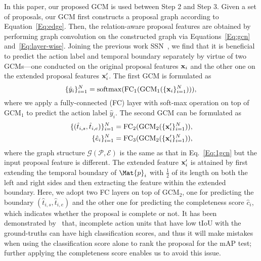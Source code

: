 \documentclass[10pt,journal,compsoc]{IEEEtran}
\begin{document}
	In this paper, our proposed GCM is used between Step 2 and Step 3. 
	Given a set of proposals, our GCM first constructs a proposal graph according to Equation~\eqref{Eq:edge}. Then, the relation-aware proposal features are obtained by performing graph convolution on the constructed graph via Equations~\eqref{Eq:gcn} and~\eqref{Eq:layer-wise}. 
	Joining the previous work SSN~\cite{zhao2017temporal}, we find that it is beneficial to predict the action label and temporal boundary separately by virtue of two GCMs---one conducted on the original proposal features ${\bf x}_i$ and the other one on the extended proposal features ${\bf x}'_{i}$. The first GCM is formulated as 
	\begin{equation}
	\label{Eq:1gcn}
	\{\hat{y}_i\}_{i=1}^{N} =  \mathrm{softmax}(\mathrm{FC}_1(\mathrm{GCM}_1(\{{\bf x}_i\}_{i=1}^N))), \\
	\end{equation}
	where we apply a fully-connected (FC) layer with soft-max operation on top of $\mathrm{GCM}_1$ to predict the action label $\hat{y}_i$. The second GCM can be formulated as 
	\begin{eqnarray}
	\label{Eq:2gcn_1}
	\{(\hat{t}_{i,s}, \hat{t}_{i,e})\}_{i=1}^{N} = \mathrm{FC}_2(\mathrm{GCM}_2(\{{\bf x}'_i\}_{i=1}^N)), \\
	\label{Eq:2gcn_2}
	\{\hat{e}_i\}_{i=1}^{N} = \mathrm{FC}_3(\mathrm{GCM}_2(\{{\bf x}'_i\}_{i=1}^N)),
	\end{eqnarray}
	where the graph structure $\mathcal{G}(\mathcal{P},\mathcal{E})$ is the same as that in Eq.~\eqref{Eq:1gcn} but the input proposal feature is different. The extended feature ${\bf x}'_{i}$ is attained by first extending the temporal boundary of $\Mat{p}_i$ with $\frac{1}{2}$ of its length on both the left and right sides and then extracting the feature within the extended boundary. Here, we adopt two FC layers on top of $\mathrm{GCM}_2$, one for predicting the boundary $(\hat{t}_{i,s}, \hat{t}_{i,e})$ and the other one for predicting the completeness score $\hat{c}_i$, which indicates whether the proposal is complete or not. It has been demonstrated by~\cite{zhao2017temporal} that, incomplete action units that have low tIoU with the ground-truths can have high classification scores, and thus it will make mistakes when using the classification score alone to rank the proposal for the mAP test; further applying the completeness score enables us to avoid this issue.
	
\end{document}
